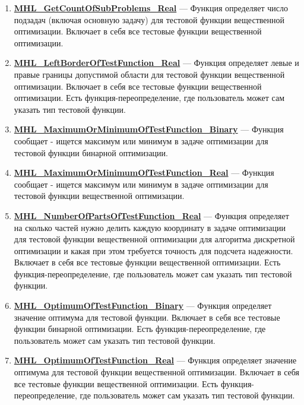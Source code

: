 \documentclass[a4paper,12pt]{article}
\begin{document}
\begin{enumerate}
\item \textbf{\hyperref[MHL_GetCountOfSubProblems_Real]{MHL\_GetCountOfSubProblems\_Real}} --- Функция определяет число подзадач (включая основную задачу) для тестовой функции вещественной оптимизации. Включает в себя все тестовые функции вещественной оптимизации.

\item \textbf{\hyperref[MHL_LeftBorderOfTestFunction_Real]{MHL\_LeftBorderOfTestFunction\_Real}} --- Функция определяет левые и правые границы допустимой области для тестовой функции вещественной оптимизации. Включает в себя все тестовые функции вещественной оптимизации. Есть функция-переопределение, где пользователь может сам указать тип тестовой функции.

\item \textbf{\hyperref[MHL_MaximumOrMinimumOfTestFunction_Binary]{MHL\_MaximumOrMinimumOfTestFunction\_Binary}} --- 	Функция сообщает - ищется максимум или минимум в задаче оптимизации для тестовой функции бинарной оптимизации.

\item \textbf{\hyperref[MHL_MaximumOrMinimumOfTestFunction_Real]{MHL\_MaximumOrMinimumOfTestFunction\_Real}} --- 	Функция сообщает - ищется максимум или минимум в задаче оптимизации для тестовой функции вещественной оптимизации.

\item \textbf{\hyperref[MHL_NumberOfPartsOfTestFunction_Real]{MHL\_NumberOfPartsOfTestFunction\_Real}} --- Функция определяет на сколько частей нужно делить каждую координату в задаче оптимизации для тестовой функции вещественной оптимизации для алгоритма дискретной оптимизации и какая при этом требуется точность для подсчета надежности. Включает в себя все тестовые функции вещественной оптимизации. Есть функция-переопределение, где пользователь может сам указать тип тестовой функции.

\item \textbf{\hyperref[MHL_OptimumOfTestFunction_Binary]{MHL\_OptimumOfTestFunction\_Binary}} --- Функция определяет значение оптимума для тестовой функции. Включает в себя все тестовые функции бинарной оптимизации. Есть функция-переопределение, где пользователь может сам указать тип тестовой функции.

\item \textbf{\hyperref[MHL_OptimumOfTestFunction_Real]{MHL\_OptimumOfTestFunction\_Real}} --- Функция определяет значение оптимума для тестовой функции вещественной оптимизации. Включает в себя все тестовые функции вещественной оптимизации. Есть функция-переопределение, где пользователь может сам указать тип тестовой функции.


\end{enumerate}
\end{document}
